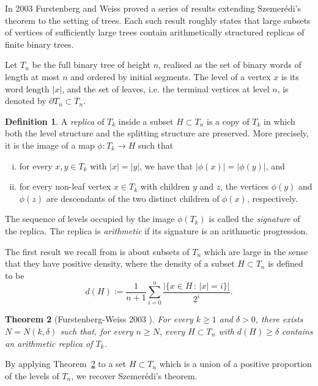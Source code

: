\documentclass[11pt]{amsart}
\newcommand\labs[1]{\left\lvert#1\right\rvert}
\renewcommand{\geq}{\geqslant}
\theoremstyle{plain}
\newtheorem{thm}{Theorem}[section]
\theoremstyle{definition}
\newtheorem{defn}[thm]{Definition}
\theoremstyle{remark}
\begin{document}
In 2003 Furstenberg and Weiss \cite{FW} proved a series of results extending Szemer\'{e}di's theorem to the setting of trees. Each such result roughly states that large subsets of vertices of sufficiently large trees contain arithmetically structured replicas of finite binary trees.

Let $T_n$ be the full binary tree of height $n$, realised as the set of binary words of length at most $n$ and ordered by initial segments. The level of a vertex $x$ is its word length $\labs{x}$, and the set of leaves, i.e. the terminal vertices at level $n$, is denoted by $\partial T_n\subset T_n$.
\begin{defn}\label{Def: Replica of T_k}
A \textit{replica} of $T_k$ inside a subset $H\subset T_n$ is a copy of $T_k$ in which both the level structure and the splitting structure are preserved. More precisely, it is the image of a map $\phi: T_k \to H$ such that
\begin{enumerate}[(i)]
\item for every $x,y\in T_k$ with $\labs{x}=\labs{y}$, we have that $\labs{\phi(x)} = \labs{\phi(y)}$, and
\item for every non-leaf vertex $x\in T_k$ with children $y$ and $z$, the vertices $\phi(y)$ and $\phi(z)$ are descendants of the two distinct children of $\phi(x)$, respectively.
\end{enumerate}
The sequence of levels occupied by the image $\phi(T_k)$ is called the \textit{signature} of the replica. The replica is \textit{arithmetic} if its signature is an arithmetic progression.
\end{defn}
The first result we recall from \cite{FW} is about subsets of $T_n$ which are large in the sense that they have positive density, where the density of a subset $H\subset T_n$ is defined to be
\[ d(H):=\frac{1}{n+1}\sum_{i=0}^n \frac{\labs{\{x \in H \, : \, \labs{x} = i\}}}{2^i}.\]
\begin{thm}[Furstenberg-Weiss 2003 \cite{FW}]\label{Th:FW Density}
For every $k\geq1$ and $\delta>0$, there exists $N=N(k,\delta)$ such that, for every $n\geq N$, every $H\subset T_n$ with $d(H)\geq\delta$ contains an arithmetic replica of $T_k$.
\end{thm}
By applying Theorem~\ref{Th:FW Density} to a set $H\subset T_n$ which is a union of a positive proportion of the levels of $T_n$, we recover Szemer\'{e}di's theorem.
\end{document}

